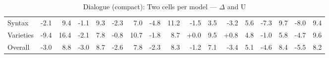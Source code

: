 \begin{table}[h]
{\begin{tabular}{lrrrrrrrrrrrrrrrr}
Syntax & \cellcolor{red!4} -2.1 & \cellcolor{blue!24} 9.4 & \cellcolor{red!2} -1.1 & \cellcolor{blue!24} 9.3 & \cellcolor{red!4} -2.3 & \cellcolor{blue!18} 7.0 & \cellcolor{red!9} -4.8 & \cellcolor{blue!29} 11.2 & \cellcolor{red!2} -1.5 & \cellcolor{blue!9} 3.5 & \cellcolor{red!6} -3.2 & \cellcolor{blue!14} 5.6 & \cellcolor{red!14} -7.3 & \cellcolor{blue!25} 9.7 & \cellcolor{red!16} -8.0 & \cellcolor{blue!24} 9.4 \\
Varieties & \cellcolor{red!18} -9.4 & \cellcolor{blue!42} 16.4 & \cellcolor{red!4} -2.1 & \cellcolor{blue!20} 7.8 & \cellcolor{red!1} -0.8 & \cellcolor{blue!28} 10.7 & \cellcolor{red!3} -1.8 & \cellcolor{blue!22} 8.7 & \cellcolor{red!0} +0.0 & \cellcolor{blue!25} 9.5 & \cellcolor{green!1} +0.8 & \cellcolor{blue!12} 4.8 & \cellcolor{red!1} -1.0 & \cellcolor{blue!15} 5.8 & \cellcolor{red!9} -4.7 & \cellcolor{blue!25} 9.6 \\
Overall & \cellcolor{red!5} -3.0 & \cellcolor{blue!23} 8.8 & \cellcolor{red!5} -3.0 & \cellcolor{blue!22} 8.7 & \cellcolor{red!5} -2.6 & \cellcolor{blue!20} 7.8 & \cellcolor{red!4} -2.3 & \cellcolor{blue!22} 8.3 & \cellcolor{red!2} -1.2 & \cellcolor{blue!18} 7.1 & \cellcolor{red!6} -3.4 & \cellcolor{blue!13} 5.1 & \cellcolor{red!9} -4.6 & \cellcolor{blue!22} 8.4 & \cellcolor{red!10} -5.5 & \cellcolor{blue!21} 8.2 \\
\bottomrule
\end{tabular}}
\caption{Dialogue (compact): Two cells per model — $\Delta$ and U}\label{tab:dialogue_compact_combined_cells}
\end{table}